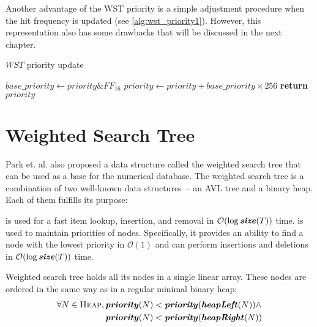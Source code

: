 Another advantage of the WST priority is a simple adjustment procedure when the hit frequency is updated (see \cref{alg:wst_priority1}). However, this representation also has some drawbacks that will be discussed in the next chapter.

\begin{algorithm}
\caption{$WST$ priority update}\label{alg:wst_priority1}
\begin{algorithmic}[1]
    \State $base\_priority\gets priority \mathrel{\&} FF_{16}$
    \State $priority \gets priority + base\_priority \times 256$
    \State {}
    \State \textbf{return} $priority$
  \EndProcedure
\end{algorithmic}
\end{algorithm}

\section{Weighted Search Tree}

Park et. al. also proposed a data structure called the weighted search tree that can be used as a base for the numerical database. The weighted search tree is a combination of two well-known data structures~-- an AVL tree and a binary heap. Each of them fulfills its purpose:
\begin{block-description}
 is used for a fast item lookup, insertion, and removal in $\mathcal{O}(\log{\ensuremath{\textbf{\textit{size}}(T)}})$ time.
 is used to maintain priorities of nodes. Specifically, it provides an ability to find a node with the lowest priority in $\mathcal{O}(1)$ and can perform insertions and deletions in $\mathcal{O}(\log{\ensuremath{\textbf{\textit{size}}(T)}})$ time.
\end{block-description}

Weighted search tree holds all its nodes in a single linear array. These nodes are ordered in the same way as in a regular minimal binary heap:
\begin{equation}
\begin{aligned}
  \forall N \in \textsc{Heap},{}
  & \textbf{\textit{priority}}(N) < \textbf{\textit{priority}}(\textbf{\textit{heapLeft}}(N)) {} \land \\
     & \textbf{\textit{priority}}(N) < \textbf{\textit{priority}}(\textbf{\textit{heapRight}}(N))
\end{aligned}
\end{equation}

